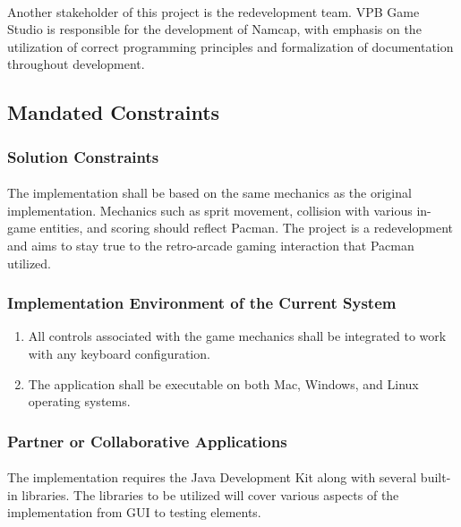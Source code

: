 \documentclass[12pt, titlepage]{article}
\begin{document}
\paragraph{}
Another stakeholder of this project is the redevelopment team. VPB Game Studio is responsible for the development of Namcap, with emphasis on the utilization of correct programming principles and formalization of documentation throughout development.

\subsection{Mandated Constraints}

\subsubsection{Solution Constraints}
\paragraph{}
The implementation shall be based on the same mechanics as the original implementation. Mechanics such as sprit movement, collision with various in-game entities, and scoring should reflect Pacman. The project is a redevelopment and aims to stay true to the retro-arcade gaming interaction that Pacman utilized. 

\subsubsection{Implementation Environment of the Current System}
\begin{enumerate}[i]
\item All controls associated with the game mechanics shall be integrated to work with any keyboard configuration.
\item The application shall be executable on both Mac, Windows, and Linux operating systems.
\end{enumerate} 

\subsubsection{Partner or Collaborative Applications}
\paragraph{}
The implementation requires the Java Development Kit along with several built-in libraries. The libraries to be utilized will cover various aspects of the implementation from GUI to testing elements.
\end{document}
